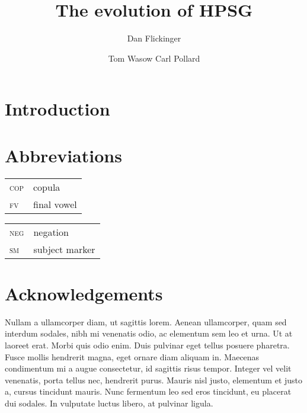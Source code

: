 \documentclass[output=paper]{langsci/langscibook}
\title{The evolution of HPSG}
\author{%
	Dan Flickinger\affiliation{Stanford University}%
	\and Tom Wasow\affiliation{Stanford University}%
	\lastand Carl Pollard\affiliation{Ohio State Universtiy}
}
\begin{document}
\label{chap-evolution}

\section{Introduction}

 \citep{Chomsky57a}



\section*{Abbreviations}
\begin{tabularx}{.45\textwidth}{lX}
\textsc{cop} & copula\\ 
\textsc{fv} & final vowel\\
\end{tabularx}
\begin{tabularx}{.45\textwidth}{lX}
\textsc{neg} & negation\\ 
\textsc{sm} & subject marker\\
\end{tabularx}

\section*{Acknowledgements}
Nullam a ullamcorper diam, ut sagittis lorem. Aenean ullamcorper, quam sed interdum sodales, nibh mi venenatis odio, ac elementum sem leo et urna. Ut at laoreet erat. Morbi quis odio enim. Duis pulvinar eget tellus posuere pharetra. Fusce mollis hendrerit magna, eget ornare diam aliquam in. Maecenas condimentum mi a augue consectetur, id sagittis risus tempor. Integer vel velit venenatis, porta tellus nec, hendrerit purus. Mauris nisl justo, elementum et justo a, cursus tincidunt mauris. Nunc fermentum leo sed eros tincidunt, eu placerat dui sodales. In vulputate luctus libero, at pulvinar ligula. 

{\sloppy
\printbibliography[heading=subbibliography,notkeyword=this]
}
\end{document}
